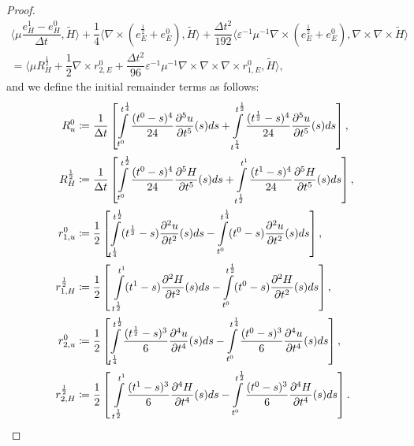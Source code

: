 \documentclass{amsart}
\theoremstyle{thmstyleone}%
\theoremstyle{thmstyletwo}%
\theoremstyle{thmstylethree}%
\newcommand{\aInnerproduct}[2]{\bigl\langle #1, #2 \bigr\rangle}
\begin{document}
\begin{proof}
 \begin{multline*}
 \aInnerproduct{\mu \dfrac{e_H^1 - e_H^0}{\Delta t}}{\widetilde{H}} + \dfrac{1}{4} \aInnerproduct{\nabla \times \left( e_E^{\frac{1}{2}} + e_E^0 \right)}{\widetilde{H}} + \dfrac{\Delta t^2}{192} \aInnerproduct{ \varepsilon^{-1}\mu^{-1} \nabla \times \left(e_E^{\frac{1}{2}} + e_E^0 \right)}{ \nabla \times \nabla \times  \widetilde{H}}\\  = \aInnerproduct{\mu R_H^{\frac{1}{2}}+ \dfrac{1}{2} \nabla \times r_{2,E}^0 + \dfrac{\Delta t^2}{96} \varepsilon^{-1}\mu^{-1} \nabla \times \nabla \times \nabla \times r_{1,E}^0}{\widetilde{H}},
\end{multline*}
and we define the initial remainder terms as follows:
\begin{align*}
R^0_u & \coloneq \dfrac{1}{\Delta t} \left[ \int\limits_{t^0}^{t^\frac{1}{4}} \dfrac{(t^0 - s)^4}{24} \dfrac{\partial^5 u}{\partial t^5}(s) ds + \int\limits_{t^\frac{1}{4}}^{t^{\frac{1}{2}}} \dfrac{(t^{\frac{1}{2}} - s)^4}{24} \dfrac{\partial^5 u}{\partial t^5}(s) ds \right], \\
R^{ \frac{1}{2}}_H & \coloneq \dfrac{1}{\Delta t} \left[ \int\limits_{t^0}^{t^{ \frac{1}{2}}} \dfrac{(t^0 - s)^4}{24} \dfrac{\partial^5 H}{\partial t^5}(s) ds + \int\limits_{t^{\frac{1}{2}}}^{t^{1}} \dfrac{(t^{1} - s)^4}{24} \dfrac{\partial^5 H}{\partial t^5}(s) ds\right], \\
r_{1,u}^0 & \coloneqq \dfrac{1}{2} \left[\int\limits_{\mathclap{t^\frac{1}{4}}}^{t^{ \frac{1}{2}}} (t^{ \frac{1}{2}} - s) \dfrac{\partial^2 u}{\partial t^2}(s) ds - \int\limits_{t^0}^{t^\frac{1}{4}} (t^0 - s) \dfrac{\partial^2 u}{\partial t^2}(s) ds\right], \\
r_{1,H}^{ \frac{1}{2}} & \coloneqq \dfrac{1}{2} \left[\,\, \int\limits_{\mathclap{t^{\frac{1}{2}}}}^{t^{1}} (t^{1} - s) \dfrac{\partial^2 H}{\partial t^2}(s) ds - \int\limits_{t^0}^{t^{\frac{1}{2}}} (t^0 - s) \dfrac{\partial^2 H}{\partial t^2}(s) ds\right], \\
r_{2,u}^0 & \coloneqq \dfrac{1}{2} \left[\int\limits_{\mathclap{t^\frac{1}{4}}}^{t^{ \frac{1}{2}}} \dfrac{(t^{ \frac{1}{2}} - s)^3}{6} \dfrac{\partial^4 u}{\partial t^4}(s) ds - \int\limits_{t^0}^{t^\frac{1}{4}} \dfrac{(t^0 - s)^3}{6} \dfrac{\partial^4 u}{\partial t^4}(s) ds\right], \\
r_{2,H}^{ \frac{1}{2}} & \coloneqq \dfrac{1}{2} \left[\,\, \int\limits_{\mathclap{t^{\frac{1}{2}}}}^{t^{1}} \dfrac{(t^{1} - s)^3}{6} \dfrac{\partial^4 H}{\partial t^4}(s) ds - \int\limits_{t^0}^{t^{\frac{1}{2}}} \dfrac{(t^0 - s)^3}{6} \dfrac{\partial^4 H}{\partial t^4}(s) ds\right].

\end{align*}
\end{proof}
\end{document}
